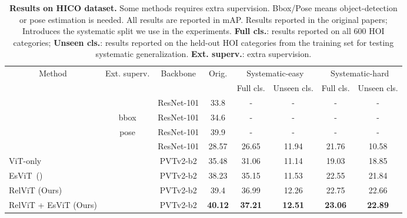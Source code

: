 \documentclass{article} \usepackage{iclr2022_conference,times}
\begin{document}
\begin{table}[t!]
    \centering
    \setlength\tabcolsep{1.5pt}
    \begin{tabular}{lccccccc}
    \toprule
         \multicolumn{1}{c}{\multirow{2}{*}{Method}} & \multicolumn{1}{c}{\multirow{2}{*}{Ext. superv.}}  & \multicolumn{1}{c}{\multirow{2}{*}{Backbone}} & \multicolumn{1}{c}{\multirow{2}{*}{Orig.}} & \multicolumn{2}{c}{Systematic-easy} & \multicolumn{2}{c}{Systematic-hard}  \\ \cline{5-8}
         &&&&\small{Full cls.}&\small{Unseen cls.}&\small{Full cls.}&\small{Unseen cls.} \\
    \midrule 
         \cite{mallya2016learning}& & ResNet-101 &33.8 & - & - &-&-\\  \cite{girdhar2017attentional} &bbox &ResNet-101& 34.6 & - & -& -&-\\  \cite{fang2018pairwise}  &pose &ResNet-101& 39.9 & - &-& -&-\\  \cite{vcl} &&ResNet-101 &28.57 &26.65 &11.94&21.76 &10.58\\  \midrule
         ViT-only & &PVTv2-b2&35.48 &31.06 &11.14&19.03 &18.85\\  EsViT~(\citeyear{esvit})  &&PVTv2-b2 &38.23 &35.15 &11.53 &22.55&21.84 \\  \rowcolor[gray]{0.9}
         RelViT (Ours)  &&PVTv2-b2 & 39.4 & 36.99 & 12.26&22.75&22.66\\  \rowcolor[gray]{0.9}
         RelViT + EsViT (Ours) & &PVTv2-b2& \textbf{40.12} & \textbf{37.21} & \textbf{12.51} &\textbf{23.06}&\textbf{22.89} \\  \bottomrule
    \end{tabular}
    \vskip -0.1in
    \caption{\textbf{Results on HICO dataset.} Some methods requires extra supervision. Bbox/Pose means object-detection or pose estimation is needed. All results are reported in mAP. Results reported in the original papers; Introduces the systematic split we use in the experiments. \textbf{Full cls.}: results reported on all 600 HOI categories; \textbf{Unseen cls.}: results reported on the held-out HOI categories from the training set for testing systematic generalization. \textbf{Ext. superv.}: extra supervision.}
    \label{tab:main_hico}
    \vskip -0.25in
\end{table}
\end{document}
